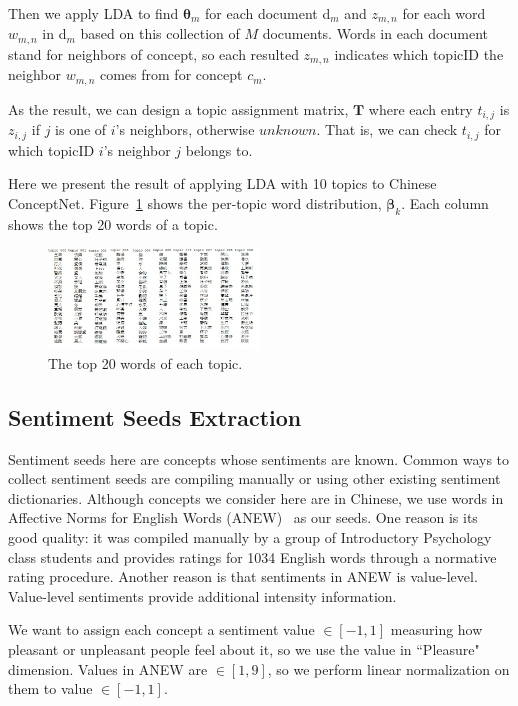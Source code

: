 Then we apply LDA to find $\boldsymbol{\theta}_m$ for each document d$_m$ and $z_{m,n}$ for each word $w_{m,n}$ in d$_m$ based on this collection of $M$ documents. Words in each document stand for neighbors of concept, so each resulted $z_{m,n}$ indicates which topicID the neighbor $w_{m,n}$ comes from for concept $c_m$.

As the result, we can design a topic assignment matrix, $\boldsymbol{T}$ where each entry $t_{i,j}$ is $z_{i,j}$ if $j$ is one of $i$'s neighbors, otherwise $unknown$. That is, we can check $t_{i,j}$ for which topicID $i$'s neighbor $j$ belongs to. 

Here we present the result of applying LDA with 10 topics to Chinese ConceptNet. Figure~\ref{fig:wordTop20} shows the per-topic word distribution, $\boldsymbol{\beta}_k$. Each column shows the top 20 words of a topic.

\begin{figure}[!t]
\centering
\includegraphics[width=0.5\textwidth]{fig/wordTop20.jpg}
\caption{The top 20 words of each topic.}
\label{fig:wordTop20}
\end{figure}

\subsection{Sentiment Seeds Extraction}
Sentiment seeds here are concepts whose sentiments are known. Common ways to collect sentiment seeds are compiling manually or using other existing sentiment dictionaries. Although concepts we consider here are in Chinese, we use words in Affective Norms for English Words (ANEW)~\cite{Bradley:ANEW99} as our seeds. One reason is its good quality: it was compiled manually by a group of Introductory Psychology class students and provides ratings for 1034 English words through a normative rating procedure. Another reason is that sentiments in ANEW is value-level. Value-level sentiments provide additional intensity information.

We want to assign each concept a sentiment value $\in [-1,1]$ measuring how pleasant or unpleasant people feel about it, so we use the value in ``Pleasure" dimension. Values in ANEW are $\in [1,9]$, so we perform linear normalization on them to value $\in [-1,1]$.

